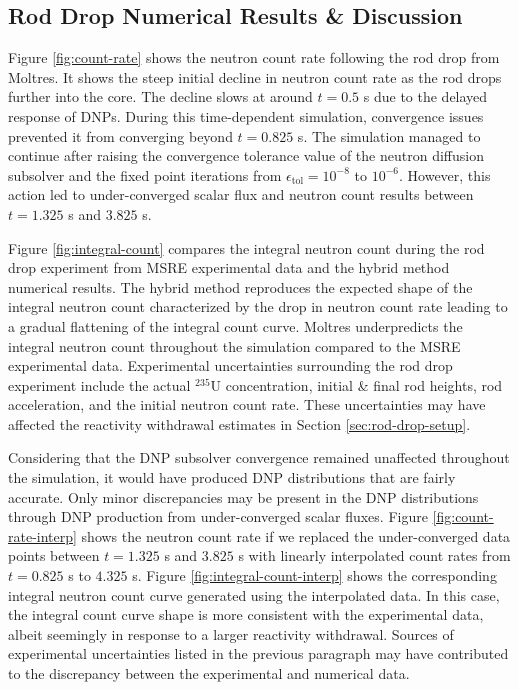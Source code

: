 \subsection{Rod Drop Numerical Results \& Discussion}

Figure \ref{fig:count-rate} shows the neutron count rate following the rod drop from Moltres. It
shows the steep initial decline in neutron count rate as the rod drops further into the core. The
decline slows at around $t=0.5$ s due to the delayed response of \glspl{DNP}. During this
time-dependent simulation, convergence issues prevented it from converging beyond $t=0.825$ s. The
simulation managed to continue after raising the convergence tolerance value of the neutron
diffusion subsolver and the fixed point iterations from $\epsilon_\text{tol}=10^{-8}$ to $10^{-6}$.
However, this action led to under-converged scalar flux and neutron count results between $t=1.325$
s and $3.825$ s.

Figure \ref{fig:integral-count} compares the integral neutron count during the rod drop experiment
from \gls{MSRE} experimental data and the hybrid method numerical results. The hybrid method
reproduces the expected shape of the integral
neutron count characterized by the drop in neutron count rate leading to a gradual flattening of
the integral count curve. Moltres underpredicts the integral neutron count throughout the
simulation compared to the \gls{MSRE} experimental data.
Experimental uncertainties surrounding the rod drop experiment include the actual $^{235}$U
concentration, initial \& final rod heights, rod acceleration, and the initial neutron count rate.
These uncertainties may have affected the reactivity withdrawal estimates in Section
\ref{sec:rod-drop-setup}.

Considering that the \gls{DNP} subsolver convergence remained unaffected throughout the simulation,
it would have produced \gls{DNP} distributions that are fairly accurate. Only minor discrepancies
may be present in the \gls{DNP} distributions through \gls{DNP} production from under-converged
scalar fluxes. Figure \ref{fig:count-rate-interp} shows the neutron count rate if we replaced the
under-converged data points between $t=1.325$ s and $3.825$ s with linearly interpolated count
rates from $t=0.825$ s to $4.325$ s. Figure \ref{fig:integral-count-interp} shows the corresponding
integral neutron count curve generated using the interpolated data. In this case, the integral
count curve shape is more consistent with the experimental data, albeit seemingly in response to a
larger reactivity withdrawal. Sources of experimental uncertainties listed in the previous
paragraph may have contributed to the discrepancy between the experimental and numerical data.

